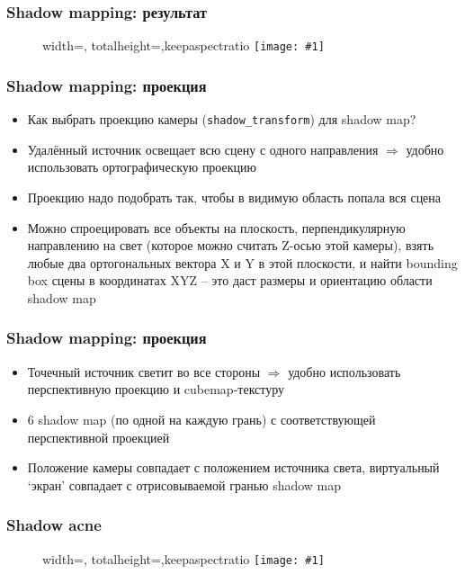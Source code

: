 \documentclass[10pt]{beamer}
\newcommand{\slideimage}[1]{
  \begin{figure}
    \begin{adjustbox}{width=\textwidth, totalheight=\textheight-2\baselineskip-2\baselineskip,keepaspectratio}
      \texttt{[image: \#1]}
    \end{adjustbox}
  \end{figure}
}
\begin{document}
\begin{frame}[fragile]
\frametitle{Shadow mapping: результат}
\slideimage{shadow-mapping2.png}
\end{frame}

\begin{frame}[fragile]
\frametitle{Shadow mapping: проекция}
\begin{itemize}
\item Как выбрать проекцию камеры (\verb|shadow_transform|) для shadow map?
\pause
\item Удалённый источник освещает всю сцену с одного направления \begin{math}\Longrightarrow\end{math} удобно использовать ортографическую проекцию
\pause
\item Проекцию надо подобрать так, чтобы в видимую область попала вся сцена
\pause
\item Можно спроецировать все объекты на плоскость, перпендикулярную направлению на свет (которое можно считать Z-осью этой камеры), взять любые два ортогональных вектора X и Y в этой плоскости, и найти bounding box сцены в координатах XYZ -- это даст размеры и ориентацию области shadow map
\end{itemize}
\end{frame}

\begin{frame}[fragile]
\frametitle{Shadow mapping: проекция}
\begin{itemize}
\item Точечный источник светит во все стороны \begin{math}\Longrightarrow\end{math} удобно использовать перспективную проекцию и cubemap-текстуру
\pause
\item 6 shadow map (по одной на каждую грань) с соответствующей перспективной проекцией
\pause
\item Положение камеры совпадает с положением источника света, виртуальный `экран' совпадает с отрисовываемой гранью shadow map
\end{itemize}
\end{frame}

\begin{frame}[fragile]
\frametitle{Shadow acne}
\slideimage{shadow-acne.png}
\end{frame}
\end{document}
